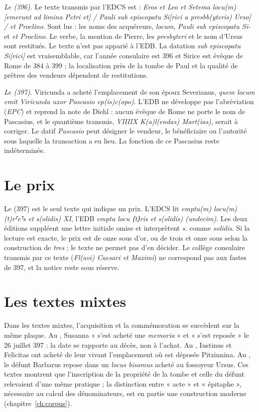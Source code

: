 \emph{Le  (396).} Le texte transmis par l’EDCS est : \emph{Eros et Leo et Setema locu(m) [emerunt ad limina Petri et] / Pauli sub episcopatu Si[rici a presbb(yteris) Urso] / et Proclino}. Sont lus : les noms des acquéreurs, \emph{locum}, \emph{Pauli sub episcopatu Si-} et \emph{et Proclino}. Le verbe, la mention de Pierre, les \emph{presbyteri} et le nom d’Ursus sont restitués. Le texte n’est pas apparié à l’EDB. La datation \emph{sub episcopatu Si[rici]} est vraisemblable, car l’année consulaire est 396 et Sirice est évêque de Rome de 384 à 399 ; la localisation près de la tombe de Paul et la qualité de prêtres des vendeurs dépendent de restitutions.

\emph{Le  (397).} Viricunda a acheté l’emplacement de son époux Severianus, \emph{quem locum emit Viricunda uxor Pascasio ep(is)c(opo)}. L’EDB ne développe pas l’abréviation (\emph{EPC}) et reprend la note de Diehl : aucun évêque de Rome ne porte le nom de Pascasius, et le quantième transmis, \emph{VIIIIX K(a)l(endas) Mart(ias)}, serait à corriger. Le datif \emph{Pascasio} peut désigner le vendeur, le bénéficiaire ou l’autorité sous laquelle la transaction a eu lieu. La fonction de ce Pascasius reste indéterminée.

\section{Le prix}

Le  (397) est le seul texte qui indique un prix. L’EDCS lit \emph{emptu(m) locu(m) (t)r⸢e⸣s et s(olidis) XI}, l’EDB \emph{emptu locu ⟨t⟩ris et s(olidis) (undecim)}. Les deux éditions suppléent une lettre initiale omise et interprètent \emph{s.} comme \emph{solidis}. Si la lecture est exacte, le prix est de onze sous d’or, ou de trois et onze sous selon la construction de \emph{tres} ; le texte ne permet pas d’en décider. Le collège consulaire transmis par ce texte (\emph{Fl(avi) Caesari et Maximi}) ne correspond pas aux fastes de 397, et la notice reste sous réserve.

\section{Les textes mixtes}

Dans les textes mixtes, l’acquisition et la commémoration se succèdent sur la même plaque. Au , Susanna « s’est acheté une \emph{memoria} » et « s’est reposée » le 26 juillet 397 : la date se rapporte au décès, non à l’achat. Au , Iustinus et Felicitas ont acheté de leur vivant l’emplacement où est déposée Pitzinnina. Au , le défunt Barbarus repose dans un \emph{locus bisomus} acheté au fossoyeur Ursus. Ces textes montrent que l’inscription de la propriété de la tombe et celle du défunt relevaient d’une même pratique ; la distinction entre « acte » et « épitaphe », nécessaire au calcul des dénominateurs, est en partie une construction moderne (chapitre~\ref{ch:corpus}).

